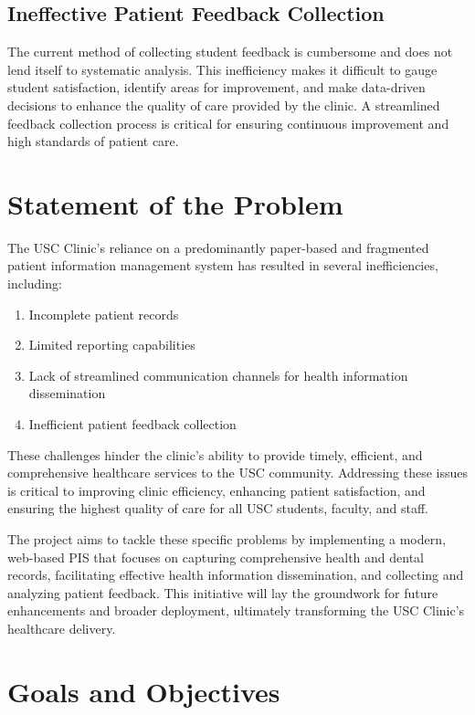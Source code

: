 \subsection{Ineffective Patient Feedback Collection}
The current method of collecting student feedback is cumbersome and does not lend itself to systematic analysis. This inefficiency makes it difficult to gauge student satisfaction, identify areas for improvement, and make data-driven decisions to enhance the quality of care provided by the clinic. A streamlined feedback collection process is critical for ensuring continuous improvement and high standards of patient care.

\section{Statement of the Problem}

The USC Clinic's reliance on a predominantly paper-based and fragmented patient information management system has resulted in several inefficiencies, including:
\begin{enumerate}
    \item Incomplete patient records
    \item Limited reporting capabilities
    \item Lack of streamlined communication channels for health information dissemination
    \item Inefficient patient feedback collection
\end{enumerate}

These challenges hinder the clinic's ability to provide timely, efficient, and comprehensive healthcare services to the USC community. Addressing these issues is critical to improving clinic efficiency, enhancing patient satisfaction, and ensuring the highest quality of care for all USC students, faculty, and staff.

The project aims to tackle these specific problems by implementing a modern, web-based PIS that focuses on capturing comprehensive health and dental records, facilitating effective health information dissemination, and collecting and analyzing patient feedback. This initiative will lay the groundwork for future enhancements and broader deployment, ultimately transforming the USC Clinic’s healthcare delivery.

\section{Goals and Objectives}

